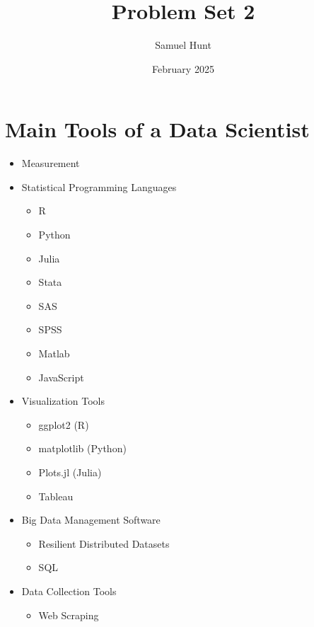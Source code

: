 \documentclass{article}
\title{Problem Set 2}
\author{Samuel Hunt}
\date{February 2025}
\begin{document}
\maketitle

\section{Main Tools of a Data Scientist}
\begin{itemize}
    \item Measurement
    \item Statistical Programming Languages
    \begin{itemize}
        \item R
        \item Python
        \item Julia
        \item Stata
        \item SAS
        \item SPSS
        \item Matlab
        \item JavaScript
    \end{itemize}
    \item Visualization Tools
    \begin{itemize}
        \item ggplot2 (R)
        \item matplotlib (Python)
        \item Plots.jl (Julia)
        \item Tableau
    \end{itemize}
    \item Big Data Management Software
    \begin{itemize}
        \item Resilient Distributed Datasets
        \item SQL
    \end{itemize}
    \item Data Collection Tools
    \begin{itemize}
        \item Web Scraping
    \end{itemize}
\end{itemize}
\end{document}
